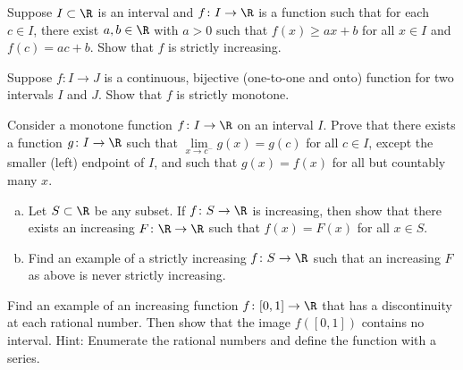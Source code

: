 \documentclass[12pt]{book}
\begin{document}
\begin{exercise}
Suppose $I \subset \R$ is an interval and $f \colon I \to \R$ is a function
such that for each $c \in I$, there exist $a, b \in \R$ with
$a > 0$ such that $f(x) \geq a x + b$ for all $x \in I$
and $f(c) = a c + b$.
Show that $f$ is strictly increasing.
\end{exercise}

\begin{exercise}
Suppose $f \colon I \to J$ is a continuous, bijective (one-to-one and onto)
function for two intervals $I$ and $J$.
Show that $f$ is strictly monotone.
\end{exercise}

\begin{exercise}
Consider a monotone function $f \colon I \to \R$ on an interval $I$.
Prove that there exists
a function $g \colon I \to \R$ such that
$\lim\limits_{x \to c^-} g(x) = g(c)$ for all $c \in I$, except the
smaller (left) endpoint of $I$, and such that
$g(x) = f(x)$ for all but countably many $x$.
\end{exercise}

\begin{exercise}
\begin{enumerate}[a)]
 \item Let $S \subset \R$ be any subset.
If $f \colon S \to \R$ is increasing,
then show that there exists an increasing $F \colon \R \to \R$
such that $f(x) = F(x)$ for all $x \in S$.
 \item Find an example of a strictly increasing $f \colon S \to \R$ such that
an increasing $F$ as above is never strictly increasing.
\end{enumerate}
\end{exercise}

\begin{exercise}[Challenging] \label{exercise:increasingfuncdiscatQ}
Find an example of an increasing function $f \colon [0,1] \to \R$
that has a discontinuity at each rational number.
Then show that the image
$f([0,1])$ contains no interval.
Hint: Enumerate
the rational numbers and define
the function with a series.
\end{exercise}



\end{document}
